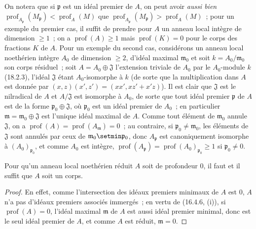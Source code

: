 \begin{env}[16.4.6.4]
\label{0.16.4.6.4-fr}
On notera que si $\mathfrak{p}$ est un idéal premier de $A$, on peut avoir
\emph{aussi bien}
$\operatorname{prof}_{A_{\mathfrak{p}}}(M_{\mathfrak{p}})
<\operatorname{prof}_A(M)$ que
$\operatorname{prof}_{A_{\mathfrak{p}}}(M_{\mathfrak{p}})
>\operatorname{prof}_A(M)$~; pour un exemple du premier cas,
il suffit de prendre pour $A$ un anneau local intègre de dimension $\geq1$~; on a
$\operatorname{prof}(A)\geq1$ mais $\operatorname{prof}(K)=0$ pour le corps
des fractions $K$ de $A$. Pour un exemple du second cas, considérons un
anneau local noethérien intègre $A_0$ de dimension $\geq2$, d'idéal maximal
$\mathfrak{m}_0$ et soit $k=A_0/\mathfrak{m}_0$ son corps résiduel~; soit
$A=A_0\oplus\mathfrak{J}$ l'extension triviale de $A_0$ par le $A_0$-module
$k$ (18.2.3), l'idéal $\mathfrak{J}$ étant $A_0$-isomorphe à $k$ (de sorte
que la multiplication dans $A$ est donnée par
$(x,z)(x',z')=(xx',xz'+x'z)$). Il est clair que $\mathfrak{J}$ est le
nilradical de $A$ et $A/\mathfrak{J}$ est isomorphe à $A_0$, de sorte que
tout idéal premier $\mathfrak{p}$ de $A$ est de la forme
$\mathfrak{p}_0\oplus\mathfrak{J}$, où $\mathfrak{p}_0$ est un idéal premier
de $A_0$~; en particulier $\mathfrak{m}=\mathfrak{m}_0\oplus\mathfrak{J}$
est l'unique idéal maximal de $A$. Comme tout élément de $\mathfrak{m}_0$
annule $\mathfrak{J}$, on a
$\operatorname{prof}(A)=\operatorname{prof}(A_{\mathfrak{m}})=0$~; au
contraire, si $\mathfrak{p}_0\neq\mathfrak{m}_0$, les éléments de
$\mathfrak{J}$ sont annulés par ceux de
$\mathfrak{m}_0\setmin\mathfrak{p}_0$, donc $A_{\mathfrak{p}}$ est canoniquement
isomorphe à $(A_0)_{\mathfrak{p}_0}$, et comme $A_0$ est intègre,
$\operatorname{prof}(A_{\mathfrak{p}})
=\operatorname{prof}(A_0)_{\mathfrak{p}_0}\geq1$ si
$\mathfrak{p}_0\neq0$.
\end{env}

\begin{corollary}[16.4.7]
\label{0.16.4.7-fr}
Pour qu'un anneau local noethérien réduit $A$ soit de profondeur $0$, il faut
et il suffit que $A$ soit un corps.
\end{corollary}

\begin{proof}
En effet, comme l'intersection des idéaux premiers minimaux de $A$ est $0$,
$A$ n'a pas d'idéaux premiers associés immergés~; en vertu de (16.4.6, (i)),
si $\operatorname{prof}(A)=0$, l'idéal maximal $\mathfrak{m}$ de $A$ est
aussi idéal premier minimal, donc est le seul idéal premier de $A$, et
comme $A$ est réduit, $\mathfrak{m}=0$.
\end{proof}

